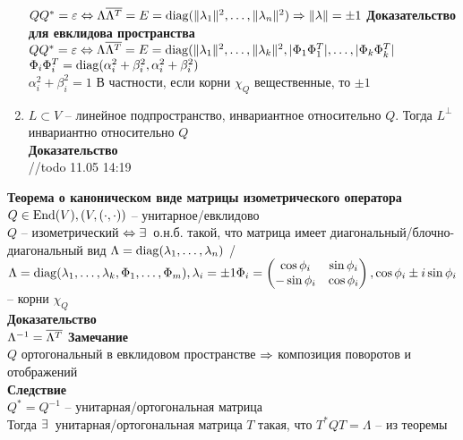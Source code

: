 \documentclass[12pt]{article}
\begin{document}
\begin{enumerate}
    $QQ^* = \varepsilon \Leftrightarrow \Lambda \overline{ \Lambda^T} = E = \operatorname{diag}(\| \lambda_1\|^2, \ldots, \| \lambda_n\|^2) \Rightarrow \|\lambda\| = \pm 1$
    \textbf{Доказательство для евклидова пространства}
    $QQ^* = \varepsilon \Leftrightarrow \Lambda \overline{ \Lambda^T} = E = \operatorname{diag}(\| \lambda_1\|^2, \ldots, \| \lambda_k\|^2, |\Phi_1\Phi_1^T|, \ldots, |\Phi_k\Phi_k^T|$\\
    $ \Phi_i \Phi_i^T = \operatorname{diag}( \alpha_i^2 + \beta_i^2, \alpha_i^2 + \beta_i^2)$\\
    $ \alpha_i^2 + \beta_i^2 = 1$
    В частности, если корни $\chi_Q$ вещественные, то $\pm 1$\\
    \item $L \subset V$ -- линейное подпространство, инвариантное относительно $Q$. Тогда $L^\perp$ инвариантно относительно $Q$\\
    \textbf{Доказательство}\\
    //todo 11.05 14:19
\end{enumerate}
\textbf{Теорема о каноническом виде матрицы изометрического оператора}\\
$Q \in \operatorname{End}(V), (V, (\cdot, \cdot))$ -- унитарное/евклидово\\
$Q$ -- изометрический $\Leftrightarrow \exists\,$ о.н.б. такой, что матрица имеет диагональный/блочно-диагональный вид
$ \Lambda = \operatorname{diag}( \lambda_1, \ldots, \lambda_n)$ / $ \Lambda = \operatorname{diag}(\lambda_1, \ldots, \lambda_k, \Phi_1, \ldots, \Phi_m), \lambda_i = \pm 1 \Phi_i = \begin{pmatrix}
    \cos \phi_i & \sin \phi_i\\
    -\sin \phi_i & \cos \phi_i
\end{pmatrix}, \cos \phi_i \pm i\sin \phi_i$ -- корни $\chi_Q$\\
\textbf{Доказательство}\\
$ \Lambda^{-1} = \overline{ \Lambda^T}$
\textbf{Замечание}\\
$Q$ ортогональный в евклидовом пространстве $\Rightarrow$ композиция поворотов и отображений\\
\textbf{Следствие}\\
$Q^* = Q^{-1}$ -- унитарная/ортогональная матрица\\
Тогда $\exists\,$ унитарная/ортогональная матрица $T$ такая, что $T^* Q T = \Lambda$ -- из теоремы\\
\end{document}
